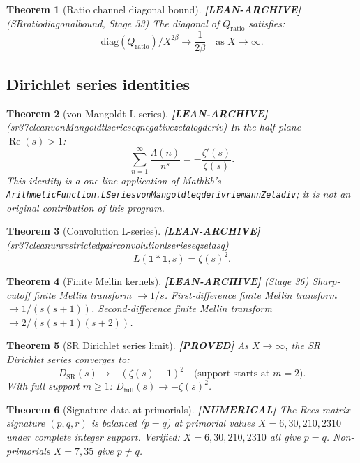 \documentclass[11pt]{article}
\newtheorem{theorem}{Theorem}[section]
\theoremstyle{remark}
\newcommand{\PROVED}{\textbf{\color{blue}[PROVED]}}
\newcommand{\NUMERICAL}{\textbf{\color{orange}[NUMERICAL]}}
\newcommand{\LEANARCHIVE}{\textbf{\color{gray}[LEAN-ARCHIVE]}}
\DeclareRobustCommand{\_}{\ifmmode\text{\textunderscore}\else\textunderscore\allowbreak\fi}
\begin{document}
\begin{theorem}[Ratio channel diagonal bound] \LEANARCHIVE{} \textnormal{(SR\_ratio\_diagonal\_bound, Stage 33)}
The diagonal of $Q_{\mathrm{ratio}}$ satisfies:
\[
\mathrm{diag}(Q_{\mathrm{ratio}})/X^{2\beta} \to \frac{1}{2\beta} \quad \text{as } X \to \infty.
\]
\end{theorem}

\subsection{Dirichlet series identities}

\begin{theorem}[von Mangoldt L-series] \LEANARCHIVE{} \textnormal{(sr37\_clean\_vonMangoldt\_lseries\_eq\_negative\_zeta\_log\_deriv)}
In the half-plane $\operatorname{Re}(s) > 1$:
\[
\sum_{n=1}^\infty \frac{\Lambda(n)}{n^s} = -\frac{\zeta'(s)}{\zeta(s)}.
\]
This identity is a one-line application of Mathlib's \texttt{ArithmeticFunction.LSeries\_vonMangoldt\_eq\_deriv\_riemannZeta\_div}; it is not an original contribution of this program.
\end{theorem}

\begin{theorem}[Convolution L-series] \LEANARCHIVE{} \textnormal{(sr37\_clean\_unrestricted\_pair\_convolution\_lseries\_eq\_zeta\_sq)}
\[
L(\mathbf{1} * \mathbf{1}, s) = \zeta(s)^2.
\]
\end{theorem}

\begin{theorem}[Finite Mellin kernels] \LEANARCHIVE{} \textnormal{(Stage 36)}
Sharp-cutoff finite Mellin transform $\to 1/s$.
First-difference finite Mellin transform $\to 1/(s(s+1))$.
Second-difference finite Mellin transform $\to 2/(s(s+1)(s+2))$.
\end{theorem}

\begin{theorem}[SR Dirichlet series limit] \PROVED{}
As $X \to \infty$, the SR Dirichlet series converges to:
\[
D_{\mathrm{SR}}(s) \to -(\zeta(s) - 1)^2 \quad \text{(support starts at } m=2\text{)}.
\]
With full support $m \geq 1$: $D_{\mathrm{full}}(s) \to -\zeta(s)^2$.
\end{theorem}

\begin{theorem}[Signature data at primorials] \NUMERICAL{}
The Rees matrix signature $(p, q, r)$ is balanced ($p = q$) at primorial values
$X = 6, 30, 210, 2310$ under complete integer support.
Verified: $X = 6, 30, 210, 2310$ all give $p = q$.
Non-primorials $X = 7, 35$ give $p \neq q$.
\end{theorem}
\end{document}

